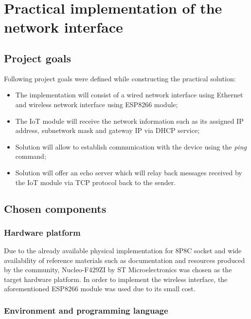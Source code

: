 \chapter{Practical implementation of the network interface}
\section{Project goals}

Following project goals were defined while constructing the practical solution: 

\begin{itemize}
    \item [1)] The implementation will consist of a wired network interface using Ethernet and wireless network interface using ESP8266 module;
    \item [2)] The IoT module will receive the network information such as its assigned IP address, subnetwork mask and gateway IP via DHCP service;
    \item [3)] Solution will allow to establish communication with the device using the \emph{ping} command;
    \item [4)] Solution will offer an echo server which will relay back messages received by the IoT module via TCP protocol back to the sender.
\end{itemize}

\section{Chosen components}
\subsection{Hardware platform}

Due to the already available physical implementation for 8P8C socket and wide availability of reference materials such as documentation and resources produced by the community, Nucleo-F429ZI by ST Microelectronics was chosen as the target hardware platform. In order to implement the wireless interface, the aforementioned ESP8266 module was used due to its small cost.

\subsection{Environment and programming language}

